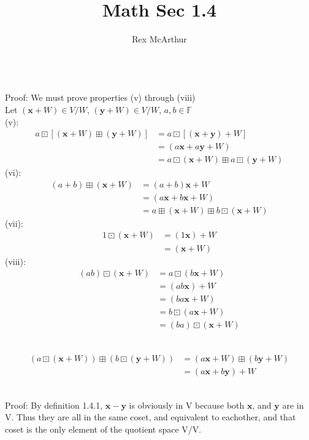 \documentclass[letterpaper,12pt]{article}
\title{Math Sec 1.4}
\author{Rex McArthur}
\theoremstyle{definition}
\begin{document}
\maketitle
{}\\
Proof: We must prove properties (v) through (viii)\\
Let $(\mathbf{x}+W) \in V/W$, $(\mathbf{y}+W) \in V/W$, $a,b \in \mathbb{F}$\\
(v): 
\begin{align*}
    a \boxdot [(\mathbf{x} + W ) \boxplus ( \mathbf{y} +W)] 
    & = a \boxdot [( \mathbf{x}+\mathbf{y})+W]\\
    & = (a \mathbf{x} + a \mathbf{y} +W)\\
    & = a \boxdot (\mathbf{x}+W) \boxplus a \boxdot (\mathbf{y}+W)
\end{align*}
(vi):
\begin{align*}
    (a+b) \boxplus ( \mathbf{x} + W) &= (a+b)\mathbf{x} + W\\
    & = (a \mathbf{x} + b \mathbf{x} + W)\\
    & = a \boxplus(\mathbf{x} + W) \boxplus b \boxdot (\mathbf{x}+W)
\end{align*}
(vii):
\begin{align*}
    1\boxdot (\mathbf{x} + W) & = (1 \mathbf{x}) + W\\
    & = (\mathbf{x} + W)
\end{align*}
(viii):
\begin{align*}
    (ab) \boxdot (\mathbf{x} + W) & = a \boxdot(b \mathbf{x} + W)\\
    & = (ab \mathbf{x}) + W \\
    & = (ba \mathbf{x} + W)\\
    & = b \boxdot (a \mathbf{x} + W)\\
    & = (ba) \boxdot (\mathbf{x} + W)
\end{align*}

\\
\begin{align*}
    (a \boxdot (\mathbf{x} + W)) \boxplus ( b \boxdot (\mathbf{y} +W)) & = (a \mathbf{x}+W)
        \boxplus (b \mathbf{y} + W)\\
        & = (a \mathbf{x} + b \mathbf{y}) +W
\end{align*}

\\
Proof: By definition 1.4.1, $\mathbf{x} - \mathbf{y}$ is obviously in V because both 
$\mathbf{x}$, and $ \mathbf{y}$ are in V. Thus they are all in the same coset, 
and equivalent to eachother, and that coset is the only element of the quotient 
space V/V. 
\end{document}
